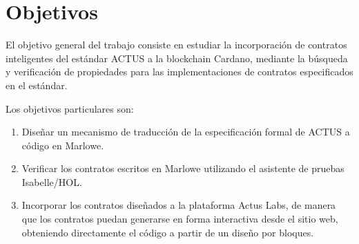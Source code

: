 \documentclass[12pt]{book}
\begin{document}

\bigskip


\section{Objetivos}

El objetivo general del trabajo consiste en estudiar la incorporación de contratos inteligentes del estándar ACTUS a la blockchain Cardano, mediante la búsqueda y verificación de propiedades para las implementaciones de contratos especificados en el estándar.

Los objetivos particulares son:

\begin{enumerate}
    \item Diseñar un mecanismo de traducción de la especificación formal de ACTUS a código en Marlowe.
    \item Verificar los contratos escritos en Marlowe utilizando el asistente de pruebas Isabelle/HOL.
    \item Incorporar los contratos diseñados a la plataforma Actus Labs, de manera que los contratos puedan generarse en forma interactiva desde el sitio web, obteniendo directamente el código a partir de un diseño por bloques.%
\end{enumerate}

\bigskip






\end{document}
